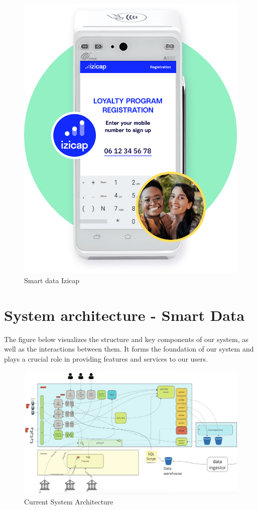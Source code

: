 \begin{figure}[H]
\centering
\includegraphics[width=0.6\linewidth]{images/smart-data-izicap.png}
\caption{Smart data Izicap}\label{fig:smart-data-Izicap}
\end{figure}

\section{System architecture - Smart Data}

The figure below visualizes the structure and key components of our system, as well as the interactions between them. It forms the foundation of our system and plays a crucial role in providing features and services to our users.

\begin{figure}[H]
\centering
\includegraphics[width=\linewidth]{images/archi-globale.png}
\caption{Current System Architecture}\label{fig:monolithic-architecture}
\end{figure}

